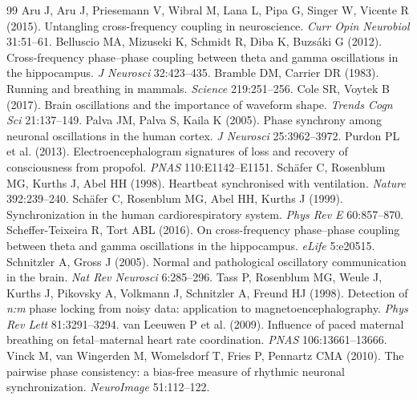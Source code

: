 \documentclass[11pt]{article}
\begin{document}
\begin{thebibliography}{99}
\small
{} Aru J, Aru J, Priesemann V, Wibral M, Lana L, Pipa G, Singer W,
Vicente R (2015). Untangling cross-frequency coupling in neuroscience. \textit{Curr Opin Neurobiol}
31:51--61.
 Belluscio MA, Mizuseki K, Schmidt R, Diba K, Buzs\'aki G
(2012). Cross-frequency phase--phase coupling between theta and gamma oscillations in the hippocampus.
\textit{J Neurosci} 32:423--435.
 Bramble DM, Carrier DR (1983). Running and breathing in
mammals. \textit{Science} 219:251--256.
 Cole SR, Voytek B (2017). Brain oscillations and the importance
of waveform shape. \textit{Trends Cogn Sci} 21:137--149.
 Palva JM, Palva S, Kaila K (2005). Phase synchrony among neuronal
oscillations in the human cortex. \textit{J Neurosci} 25:3962--3972.
 Purdon PL et al. (2013). Electroencephalogram signatures of
loss and recovery of consciousness from propofol. \textit{PNAS} 110:E1142--E1151.
 Sch\"afer C, Rosenblum MG, Kurths J, Abel HH (1998).
Heartbeat synchronised with ventilation. \textit{Nature} 392:239--240.
 Sch\"afer C, Rosenblum MG, Abel HH, Kurths J (1999).
Synchronization in the human cardiorespiratory system. \textit{Phys Rev E} 60:857--870.
 Scheffer-Teixeira R, Tort ABL (2016).
On cross-frequency phase--phase coupling between theta and gamma oscillations in the hippocampus.
\textit{eLife} 5:e20515.
 Schnitzler A, Gross J (2005). Normal and pathological
oscillatory communication in the brain. \textit{Nat Rev Neurosci} 6:285--296.
 Tass P, Rosenblum MG, Weule J, Kurths J, Pikovsky A, Volkmann J,
Schnitzler A, Freund HJ (1998). Detection of \textit{n:m} phase locking from noisy data: application to
magnetoencephalography. \textit{Phys Rev Lett} 81:3291--3294.
 van Leeuwen P et al. (2009). Influence of paced
maternal breathing on fetal--maternal heart rate coordination. \textit{PNAS} 106:13661--13666.
 Vinck M, van Wingerden M, Womelsdorf T, Fries P, Pennartz CMA
(2010). The pairwise phase consistency: a bias-free measure of rhythmic neuronal synchronization.
\textit{NeuroImage} 51:112--122.
\end{thebibliography}
\end{document}
